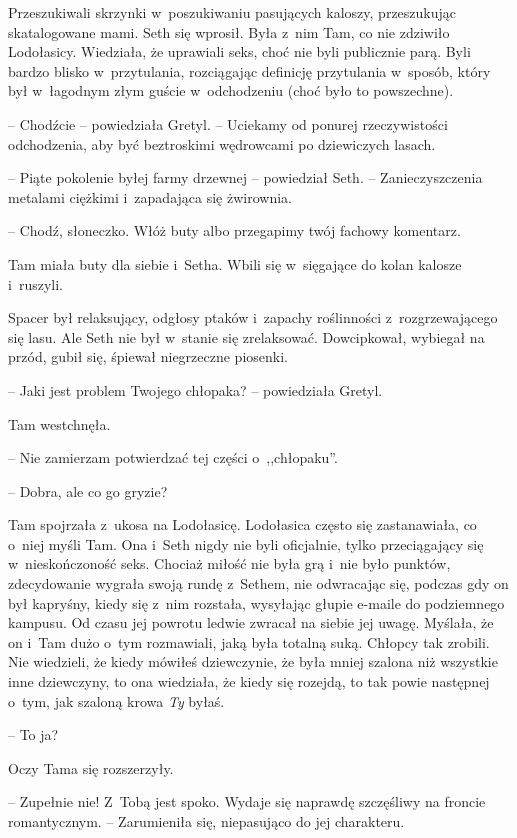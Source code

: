 \documentclass[oneside,polish,11pt,sfheadings]{mwbk}
\begin{document}
Przeszukiwali skrzynki w~poszukiwaniu pasujących kaloszy, przeszukując
skatalogowane mami. Seth się wprosił. Była z~nim Tam, co nie zdziwiło
Lodołasicy. Wiedziała, że uprawiali seks, choć nie byli publicznie parą.
Byli bardzo blisko w~przytulania, rozciągając definicję przytulania w~sposób, który był w~łagodnym złym guście w~odchodzeniu (choć było to
powszechne).

-- Chodźcie -- powiedziała Gretyl. -- Uciekamy od ponurej rzeczywistości
odchodzenia, aby być beztroskimi wędrowcami po dziewiczych lasach.

-- Piąte pokolenie byłej farmy drzewnej -- powiedział Seth. -- Zanieczyszczenia metalami ciężkimi i~zapadająca się żwirownia.

-- Chodź, słoneczko. Włóż buty albo przegapimy twój fachowy komentarz.

Tam miała buty dla siebie i~Setha. Wbili się w~sięgające do kolan
kalosze i~ruszyli.

Spacer był relaksujący, odgłosy ptaków i~zapachy roślinności z~rozgrzewającego się lasu. Ale Seth nie był w~stanie się zrelaksować.
Dowcipkował, wybiegał na przód, gubił się, śpiewał niegrzeczne piosenki.

-- Jaki jest problem Twojego chłopaka? -- powiedziała Gretyl.

Tam westchnęła. 

-- Nie zamierzam potwierdzać tej części o~,,chłopaku''.

-- Dobra, ale co go gryzie?

Tam spojrzała z~ukosa na Lodołasicę. Lodołasica często się zastanawiała,
co o~niej myśli Tam. Ona i~Seth nigdy nie byli oficjalnie, tylko
przeciągający się w~nieskończoność seks. Chociaż miłość nie była grą i~nie było punktów, zdecydowanie wygrała swoją rundę z~Sethem, nie
odwracając się, podczas gdy on był kapryśny, kiedy się z~nim rozstała,
wysyłając głupie e-maile do podziemnego kampusu. Od czasu jej powrotu
ledwie zwracał na siebie jej uwagę. Myślała, że on i~Tam dużo o~tym
rozmawiali, jaką była totalną suką. Chłopcy tak zrobili. Nie wiedzieli,
że kiedy mówiłeś dziewczynie, że była mniej szalona niż wszystkie inne
dziewczyny, to ona wiedziała, że kiedy się rozejdą, to tak powie
następnej o~tym, jak szaloną krowa \textit{Ty} byłaś.

-- To ja?

Oczy Tama się rozszerzyły. 

-- Zupełnie nie! Z~Tobą jest spoko. Wydaje się
naprawdę szczęśliwy na froncie romantycznym. -- Zarumieniła się, niepasująco do jej charakteru.
\end{document}

